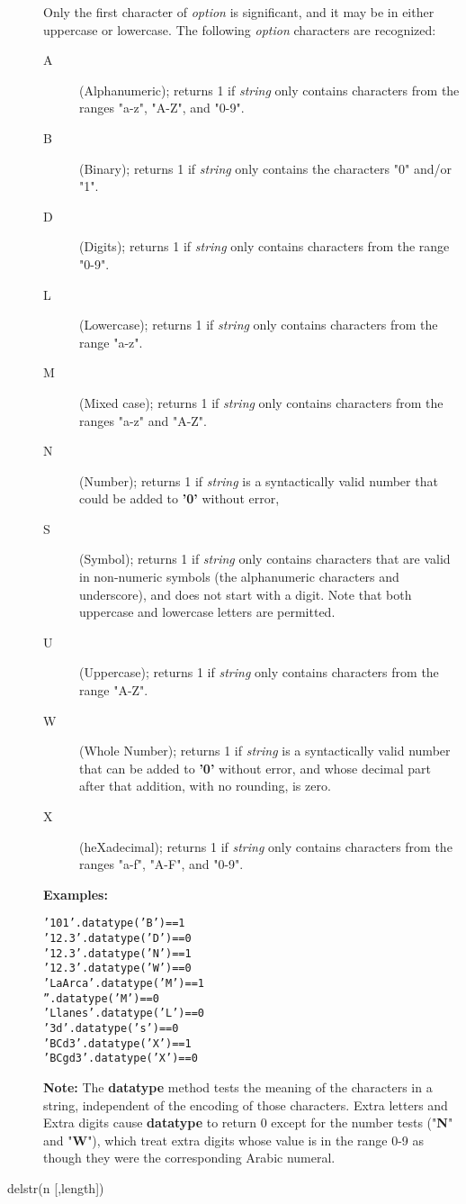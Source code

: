 \begin{description}
Only the first character of \emph{option} is significant, and it may
be in either uppercase or lowercase.
The following \emph{option} characters are recognized:
\begin{description}
\item[A]\label{refdta}
(Alphanumeric); returns 1 if \emph{string} only contains
characters from the ranges "a-z", "A-Z", and "0-9".
\item[B]\label{refdtb}
(Binary); returns 1 if \emph{string} only contains the
characters "0" and/or "1".
\item[D]\label{refdtd}
(Digits); returns 1 if \emph{string} only contains
characters from the range "0-9".
\item[L]\label{refdtl}
(Lowercase); returns 1 if \emph{string} only contains
characters from the range "a-z".
\item[M]\label{refdtm}
(Mixed case); returns 1 if \emph{string} only contains
characters from the ranges "a-z" and "A-Z".
\item[N]\label{refdtn}
(Number); returns 1 if \emph{string} is a syntactically valid
\nr{} number that could be added to \textbf{'0'} without error,
\item[S]\label{refdts}
(Symbol); returns 1 if \emph{string} only contains characters
that are valid in non-numeric symbols (the alphanumeric characters and
underscore), and does not start with a digit.  Note that both uppercase
and lowercase letters are permitted.
\item[U]\label{refdtu}
(Uppercase); returns 1 if \emph{string} only contains
characters from the range "A-Z".
\item[W]\label{refdtw}
(Whole Number); returns 1 if \emph{string} is a syntactically valid
\nr{} number that can be added to \textbf{'0'} without error, and
whose decimal part after that addition, with no rounding, is zero.
\item[X]\label{refdtx}
(heXadecimal); returns 1 if \emph{string} only contains
characters from the ranges "a-f", "A-F", and "0-9".
\end{description}
 
\textbf{Examples:}
\begin{alltt}
'101'.datatype('B')    == 1
'12.3'.datatype('D')   == 0
'12.3'.datatype('N')   == 1
'12.3'.datatype('W')   == 0
'LaArca'.datatype('M') == 1
''.datatype('M')       == 0
'Llanes'.datatype('L') == 0
'3 d'.datatype('s')    == 0
'BCd3'.datatype('X')   == 1
'BCgd3'.datatype('X')  == 0
\end{alltt}
\textbf{Note: }The \textbf{datatype} method tests the meaning of the characters
in a string, independent of the encoding of those characters.  Extra
letters and Extra digits cause \textbf{datatype} to return 0 except
for the number tests ("\textbf{N}" and "\textbf{W}"),
which treat extra digits whose value is in the range 0-9 as though they
were the corresponding Arabic numeral.
\item[delstr(n [,length{]})]\label{refdelstr}


\end{description}
